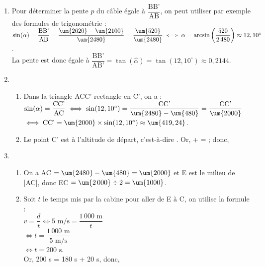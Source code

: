 \ \\ [-5mm]
   \begin{enumerate}
      \item Pour déterminer la pente $p$ du câble égale à $\dfrac{\text{BB'}}{\text{AB}}$, on peut utiliser par exemple des formules de trigonométrie : \\ [1mm]
      $\sin(\alpha) =\dfrac{\text{BB'}}{\text{AB}} =\dfrac{\um{2620}-\um{2100}}{\um{2480}} =\dfrac{\um{520}}{\um{2480}} \iff \alpha =\arcsin\left(\dfrac{520}{2\,480}\right) \approx12,10^\circ$. \\ [1.5mm]
      La pente est donc égale à $\dfrac{\text{BB'}}{\text{AB'}} =\tan(\widehat{\alpha}) =\tan(12,10^\circ) \approx0,2144$. \\ [1.5mm]
      \item
      \begin{enumerate}
         \item Dans la triangle ACC' rectangle en C', on a : \\ [1mm]
         $\sin(\alpha) =\dfrac{\text{CC'}}{\text{AC}} \iff \sin(12,10^\circ) =\dfrac{\text{CC'}}{\um{2480}-\um{480}} =\dfrac{\text{CC'}}{\um{2000}}$ \\ [1.5mm]
         $\iff \text{CC'} =\um{2000}\times\sin(12,10^\circ) \approx\um{419,24}$. \\
         \item Le point C' est à l'altitude de départ, c'est-à-dire . Or,  +  =  ; donc, \\
      \end{enumerate}
      \item
      \begin{enumerate}
         \item On a AC $=\um{2480}-\um{480} =\um{2000}$ et E est le milieu de [AC], donc EC $=\um{2\,000}\div2 =\um{1000}$. \\
         \item Soit $t$ le temps mis par la cabine pour aller de E à C, on utilise la formule : \\ [1mm]
         $v =\dfrac{d}{t} \iff 5 \text{ m/s} =\dfrac{1\,000 \text{ m}}{t}$ \\
         \hspace*{0.9cm} $\iff t = \dfrac{1\,000 \text{ m}}{5 \text{ m/s}}$ \\ [1mm]
         \hspace*{0.9cm} $\iff t  =200 \text{ s}$. \\
         Or, 200 s = 180 s + 20 s, donc, \\
      \end{enumerate}
   \end{enumerate}
